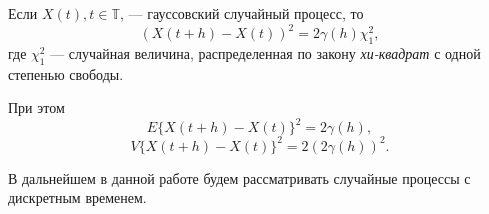 
\begin{Remark}
	Если $ X(t), t \in \mathbb{T} $, --- гауссовский случайный процесс, то
	\begin{equation*}
		( X(t + h) - X(t) )^2 = 2 \gamma(h)\chi_1^2,
	\end{equation*}
	где $\chi_1^2$ --- случайная величина, распределенная по закону \textit{хи-квадрат} с одной степенью свободы.
\end{Remark}

При этом
\begin{equation}
\label{eq:E_diff_inc}
	E \{ X(t + h) - X(t) \}^2 = 2 \gamma(h),
\end{equation}
\begin{equation}
\label{eq:V_diff_inc}
	V \{ X(t + h) - X(t) \}^2 = 2 (2 \gamma(h))^2.
\end{equation}

В дальнейшем в данной работе будем рассматривать случайные процессы с дискретным временем.